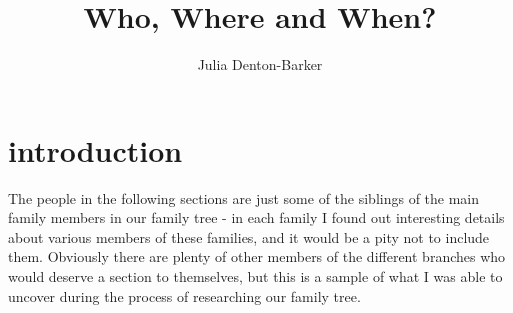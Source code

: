 \documentclass[a4paper]{article}
\title{Who, Where and When?}
\author{Julia Denton-Barker}
\begin{document}
\maketitle
\tableofcontents
\section{introduction}
The people in the following sections are just some of the siblings of the main family members in our family tree -  in each family I found out interesting details about various members  of these families, and it would be a pity not to include them.  Obviously there are plenty of other members of the different branches who would deserve a section to themselves, but this is a sample of what I was able to uncover during the process of researching our family tree.  










\end{document}
